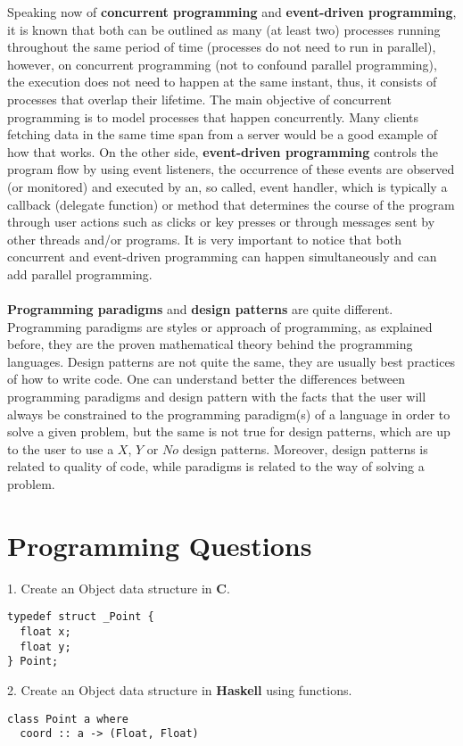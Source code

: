\documentclass[conference]{IEEEtran}
\begin{document}
Speaking now of \textbf{concurrent programming} and \textbf{event-driven programming}, it is known that both can be outlined as many (at least two) processes running throughout the same period of time (processes do not need to run in parallel), however, on concurrent programming (not to confound parallel programming), the execution does not need to happen at the same instant, thus, it consists of processes that overlap their lifetime. The main objective of concurrent programming is to model processes that happen concurrently. Many clients fetching data in the same time span from a server would be a good example of how that works. On the other side, \textbf{event-driven programming} controls the program flow by using event listeners, the occurrence of these events are observed (or monitored) and executed by an, so called, event handler, which is typically a callback (delegate function) or method that determines the course of the program through user actions such as clicks or key presses or through messages sent by other threads and/or programs. It is very important to notice that both concurrent and event-driven programming can happen simultaneously and can add parallel programming.
\\\\
\textbf{Programming paradigms} and \textbf{design patterns} are quite different. Programming paradigms are styles or approach of programming, as explained before, they are the proven mathematical theory behind the programming languages. Design patterns are not quite the same, they are usually best practices of how to write code. One can understand better the differences between programming paradigms and design pattern with the facts that the user will always be constrained to the programming paradigm(s) of a language in order to solve a given problem, but the same is not true for design patterns, which are up to the user to use a $X$, $Y$ or $No$ design patterns. Moreover, design patterns is related to quality of code, while paradigms is related to the way of solving a problem.
\section{Programming Questions}
1. Create an Object data structure in \textbf{C}.
\lstset{language=c}
\begin{lstlisting}[frame=single]
typedef struct _Point {
  float x;
  float y;
} Point;
\end{lstlisting}

2. Create an Object data structure in \textbf{Haskell} using functions.
\lstset{language=Haskell}
\begin{lstlisting}[frame=single]
class Point a where
  coord :: a -> (Float, Float)
\end{lstlisting}
\end{document}
